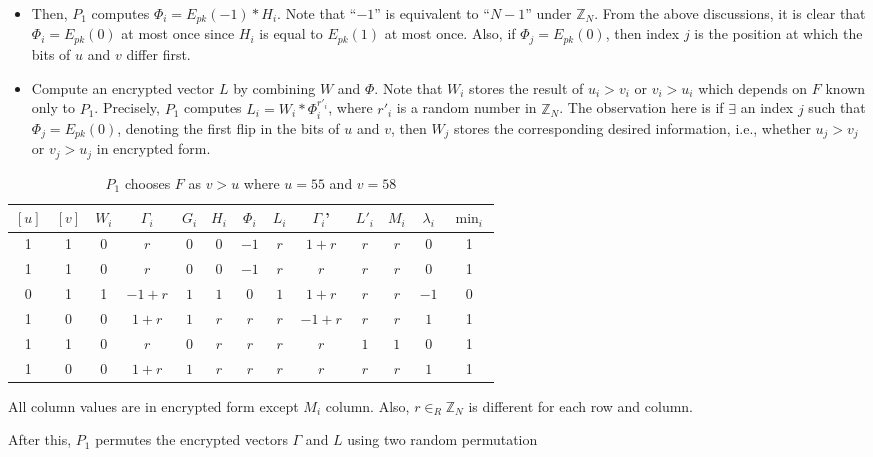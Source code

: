 \documentclass{article}
\begin{document}
\begin{itemize}
\item Then, $P_1$ computes $\Phi_i = E_{pk}(-1) \ast H_i$. Note that ``$-1$'' is 
equivalent to ``$N-1$'' under $\mathbb{Z}_N$. From 
the above discussions, it is clear that $\Phi_i = E_{pk}(0)$ at most once since $H_i$ is 
equal to $E_{pk}(1)$ at most once. Also, if $\Phi_j = E_{pk}(0)$, then index $j$ is the position 
at which the bits of $u$ and $v$ differ first.
\item Compute an encrypted vector $L$ by combining $W$ and $\Phi$. Note that $W_i$ stores 
the result of $u_i > v_i$  or $v_i > u_i$ which depends on $F$ known only to $P_1$. 
Precisely, $P_1$ computes $L_i = W_i \ast \Phi_i^{r'_i}$, where $r'_i$ is a 
random number in $\mathbb{Z}_N$. The observation here is if $\exists$ an index $j$ such 
that $\Phi_j = E_{pk}(0)$, denoting 
the first flip in the bits of $u$ and $v$, then $W_j$ stores the 
corresponding desired information, i.e., whether $u_j > v_j$ or $v_j > u_j$ in encrypted form. 
\end{itemize}
\renewcommand{\tabcolsep}{.15cm}
\begin{table}[!t]
\centering
\caption{ $P_1$ chooses $F$ as $v>u$ where $u=55$ and $v=58$} \begin{tabular}{ccccccccccccc}  
     \hline $[u]$&\;$[v]$&\;$W_i$ &\;$\Gamma_i$&\;$G_i$&\;$H_i$&\;$\Phi_i$&\;$L_i$&\;$\Gamma_i$'&\;$L'_i$&\;$M_i$&\;$\lambda_i$&\;$\min_i$\\ [1ex] \hline 1&1&0& $r$ & $0$& $0$  &$-1$ &$r$&$1+ r$&$r$&$r$&$0$ & 1\\ 
    	1&1&0& $r$ & $0$& $0$  &$-1$ &$r$&$r$&$r$&$r$&$0$ & 1\\  
    	0&1&1& $-1 + r$ & $1$&$1$  &$0$ &$1$ &$1 + r$&$r$&$r$&$-1$& 0\\   
    	1&0&0& $ 1 + r$ & $1$&$r$&$r$&$r$&$-1 + r$&$r$&$r$&$1$ & 1\\   
    	1&1&0& $r$ &$0$& $r$&$r$&$r$&$r$&$1$ &$1$&$0$ & 1\\  
    	1&0&0& $1 + r$ & $1$&$r$&$r$&$r$&$r$&$r$&$r$&$1$ & 1\\  \hline \end{tabular}\begin{tablenotes}
      \small
      \item All column values are in encrypted form except $M_i$ column. Also, 
$r \in_R \mathbb{Z}_N$ is different for each row and column. 
\end{tablenotes}

\label{table:SMIN-example} \end{table} 
After this, $P_1$ permutes the encrypted vectors $\Gamma$ and $L$ using two random permutation 
\end{document}
